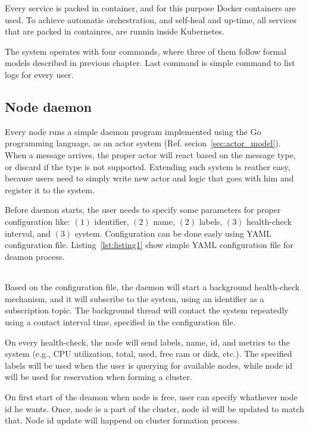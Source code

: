 Every service is packed in container, and for this purpose Docker containers are used. To achieve automatic orchestration, and self-heal and up-time, all services that are packed in containres, are runnin inside Kubernetes.

The system operates with four commands, where three of them follow formal models described in previous chapter. Last command is simple command to list logs for every user.
%
%
\subsection{Node daemon}\label{sec:node_daemon}
Every node runs a simple daemon program implemented using the Go programming language, as an actor system (Ref. secion~\ref{sec:actor_model}). When a message arrives, the proper actor will react based on the message type, or discard if the type is not supported. Extending such system is reather easy, because users need to simply write new actor and logic that goes with him and register it to the system.

Before daemon starts, the user needs to specify some parameters for proper configuration like: $(1)$ identifier, $(2)$ name, $(2)$ labels, $(3)$ health-check interval, and $(3)$ system. Configuration can be done easly using YAML configuration file. Listing~\ref{lst:listing1} show simple YAML configuration file for deamon process.

\begin{center}
	\begin{tabular}{c}
		
	\end{tabular}
\end{center}

Based on the configuration file, the daemon will start a background health-check mechanism, and it will subscribe to the system, using an identifier as a subscription topic. The background thread will contact the system repeatedly using a contact interval time, specified in the configuration file. 

On every health-check, the node will send labels, name, id, and metrics to the system (e.g., CPU utilization, total, used, free ram or disk, etc.). The specified labels will be used when the user is querying for available nodes, while node id will be used for reservation when forming a cluster.

On first start of the deamon when node is free, user can specify whathever node id he wants. Once, node is a part of the cluster, node id will be updated to match that. Node id update will happend on cluster formation process.
%
